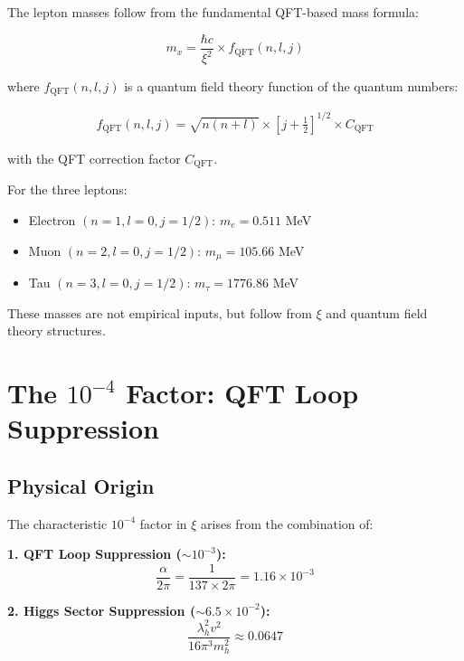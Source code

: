 \documentclass[12pt,a4paper]{article}
\begin{document}
	The lepton masses follow from the fundamental QFT-based mass formula:
	
	\begin{equation}
		m_x = \frac{\hbar c}{\xi^2} \times f_{\text{QFT}}(n, l, j)
	\end{equation}
	
	where $f_{\text{QFT}}(n, l, j)$ is a quantum field theory function of the quantum numbers:
	
	\begin{align}
		f_{\text{QFT}}(n, l, j) = \sqrt{n(n+l)} \times \left[j + \frac{1}{2}\right]^{1/2} \times C_{\text{QFT}}
	\end{align}
	
	with the QFT correction factor $C_{\text{QFT}}$.
	
	For the three leptons:
	
	\begin{itemize}
		\item Electron $(n=1, l=0, j=1/2)$: $m_e = 0.511$ MeV
		\item Muon $(n=2, l=0, j=1/2)$: $m_\mu = 105.66$ MeV
		\item Tau $(n=3, l=0, j=1/2)$: $m_\tau = 1776.86$ MeV
	\end{itemize}
	
	These masses are not empirical inputs, but follow from $\xi$ and quantum field theory structures.
	
	\section{The $10^{-4}$ Factor: QFT Loop Suppression}
	
	\subsection{Physical Origin}
	
	The characteristic $10^{-4}$ factor in $\xi$ arises from the combination of:
	
	\textbf{1. QFT Loop Suppression ($\sim 10^{-3}$):}
	\begin{equation}
		\frac{\alpha}{2\pi} = \frac{1}{137 \times 2\pi} = 1.16 \times 10^{-3}
	\end{equation}
	
	\textbf{2. Higgs Sector Suppression ($\sim 6.5 \times 10^{-2}$):}
	\begin{equation}
		\frac{\lambda_h^2 v^2}{16\pi^3 m_h^2} \approx 0.0647
	\end{equation}
	
\end{document}
